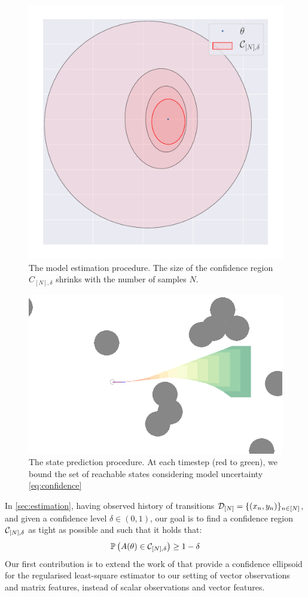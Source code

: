 \documentclass{article}
\begin{document}
\begin{figure}[t]
	\centering
	\includegraphics[trim={0 2cm 0 0}, clip, width=0.6\linewidth]{img/ellipsoid}
	\caption{The model estimation procedure. The size of the confidence region $C_{[N],\delta}$ shrinks with the number of samples $N$.}
\end{figure}

\begin{figure}[t]
	\centering
	\includegraphics[width=0.8\linewidth]{img/obstacle_small}
	\caption{The state prediction procedure. At each timestep (red to green), we bound the set of reachable states considering model uncertainty \eqref{eq:confidence}}
	\label{fig:estimation-prediction}
\end{figure}

In \autoref{sec:estimation}, having observed history of transitions $\mathcal{D}_{[N]} = \{(x_n, y_n)\}_{n\in[N]}$, and given a confidence level $\delta\in(0, 1)$, our goal is to find a confidence region $\mathcal{C}_{[N],\delta}$ as tight as possible and such that it holds that:
\begin{align}
\mathbb{P}\left(A(\theta)\in \mathcal{C}_{[N],\delta}\right) \geq 1-\delta
\label{eq:confidence}
\end{align}
Our first contribution is to extend the work of \citet{Abbasi2011} that provide a confidence ellipsoid for the regularised least-square estimator to our setting of vector observations and matrix features, instead of scalar observations and vector features.
\end{document}
